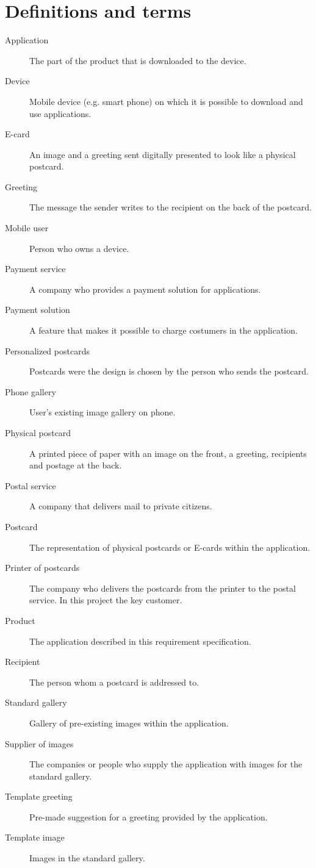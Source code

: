 \documentclass[10pt,a4paper]{article}
\begin{document}

\section{Definitions and terms}
\begin{description}
\item [Application] The part of the product that is downloaded to the device.
\item[Device] Mobile device (e.g. smart phone) on which it is possible to download and use applications.
\item [E-card] An image and a greeting sent digitally presented to look like a physical postcard.
\item[Greeting] The message the sender writes to the recipient on the back of the postcard.
\item[Mobile user] Person who owns a device. 
\item[Payment service] A company who provides a payment solution for applications. 
\item[Payment solution] A feature that makes it possible to charge costumers in the application. 
\item[Personalized postcards] Postcards were the design is chosen by the person who sends the postcard. 
\item[Phone gallery] User's existing image gallery on phone.
\item [Physical postcard] A printed piece of paper with an image on the front, a greeting, recipients and postage at the back. 
\item[Postal service] A company that delivers mail to private citizens.
\item [Postcard] The representation of physical postcards or E-cards within the application. 
\item[Printer of postcards] The company who delivers the postcards from the printer to the postal service. In this project the key customer.
\item[Product]The application described in this requirement specification.
\item[Recipient]The person whom a postcard is addressed to.
\item[Standard gallery] Gallery of pre-existing images within the application.
\item[Supplier of images] The companies or people who supply the application with images for the standard gallery.
\item [Template greeting] Pre-made suggestion for a greeting provided by the application. 
\item [Template image] Images in the standard gallery. 
\end{description}
\end{document}
